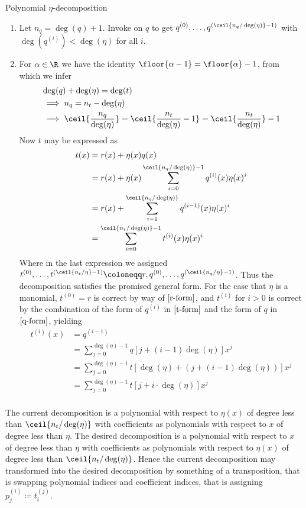 \begin{theorem}{Polynomial $\eta$-decomposition}
\begin{enumerate}
        \item
        Let $n_q=\deg(q)+1$.
        Invoke  on $q$ to get $q^{(0)},\dots,q^{(\ceil{n_q/\deg(\eta)}-1)}$ with $\deg(q^{(i)})<\deg(\eta)$ for all $i$.

        \item
        For $\alpha\in\R$ we have the identity $\floor{\alpha-1} = \floor{\alpha}-1$, from which we infer
        \begin{align}
            &\deg(q)+\deg(\eta)=\deg(t) \\
            &\implies n_q = n_t-\deg(\eta) \\
            &\implies \ceil{\frac{n_q}{\deg(\eta)}}
                = \ceil{\frac{n_t}{\deg(\eta)}-1}
                = \ceil{\frac{n_t}{\deg(\eta)}}-1
        \end{align}
        Now $t$ may be expressed as
        \begin{align}
            t(x)
            &= r(x) + \eta(x)q(x) \\
            &= r(x) + \eta(x)\sum_{i=0}^{\ceil{n_q/\deg(\eta)}-1} q^{(i)}(x)\eta(x)^i \\
            &= r(x) + \sum_{i=1}^{\ceil{n_q/\deg(\eta)}} q^{(i-1)}(x)\eta(x)^i \\
            &= \sum_{i=0}^{\ceil{n_t/\deg(\eta)}-1} t^{(i)}(x)\eta(x)^i
        \end{align}
        Where in the last expression we assigned $t^{(0)},\dots,t^{(\ceil{n_t/\eta}-1)} \coloneqq r,q^{(0)},\dots,q^{(\ceil{n_q/\eta}-1)}$.
        Thus the decomposition satisfies the promised general form.
        For the case that $\eta$ is a monomial, $t^{(0)}=r$ is correct by way of $\eqref{r-form}$, and $t^{(i)}$ for $i>0$ is correct by the combination of the form of $q^{(i)}$ in $\eqref{t-form}$ and the form of $q$ in $\eqref{q-form}$, yielding
        \begin{align}
            t^{(i)}(x) &= q^{(i-1)} \\
            &= \sum_{j=0}^{\deg(\eta)-1} q[j+(i-1)\deg(\eta)]x^j \\
            &= \sum_{j=0}^{\deg(\eta)-1} t[\deg(\eta)+(j+(i-1)\deg(\eta))]x^j \\
            &= \sum_{j=0}^{\deg(\eta)-1} t[j+i\cdot\deg(\eta)]x^j \\
        \end{align}
    \end{enumerate}

    The current decomposition is a polynomial with respect to $\eta(x)$ of degree less than $\ceil{n_t/\deg(\eta)}$ with coefficients as polynomials with respect to $x$ of degree less than $\eta$. 
    The desired decomposition is a polynomial with respect to $x$ of degree less than $\eta$ with coefficients as polynomials with respect to $\eta(x)$ of degree less than $\ceil{n_t/\deg(\eta)}$.
    Hence the current decomposition may transformed into the desired decomposition by something of a transposition, that is swapping polynomial indices and coefficient indices, that is assigning $p_j^{(i)}\coloneqq t_i^{(j)}$.
\end{theorem}


